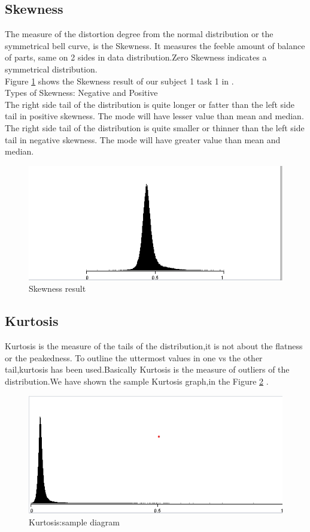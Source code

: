 \subsection{Skewness}
The measure of the distortion degree from  the normal distribution or the symmetrical bell curve, is the Skewness. It measures the feeble amount of balance of parts, same on 2 sides in data distribution.Zero Skewness indicates a symmetrical distribution.\\
Figure \ref{fig:skewness} shows the Skewness result of our subject 1 task 1 in .
\\
Types of Skewness: Negative and Positive\\
 The  right side tail of the distribution is quite longer or fatter than the left side tail in positive skewness. The mode will have lesser value than mean and median.\\
 The  right side tail of the distribution is quite smaller or thinner than the left side tail in negative skewness. The mode will have greater value than mean and median.
\begin{figure}
    \centering
    \includegraphics[width=15cm]{Pictures/skewness.png}
    \caption{Skewness result}
    \label{fig:skewness}
\end{figure}
\subsection{Kurtosis}
Kurtosis is the measure of the tails of the distribution,it is not about the  flatness or the peakedness.  To outline the uttermost values in one vs the other tail,kurtosis has been used.Basically  Kurtosis is the measure of outliers  of the distribution.We have shown the sample Kurtosis graph,in the Figure \ref{fig:kurtosis} .
\begin{figure}
    \centering
    \includegraphics[width=15cm]{Pictures/kurtosis.png}
    \caption{Kurtosis:sample diagram}
    \label{fig:kurtosis}
\end{figure}

